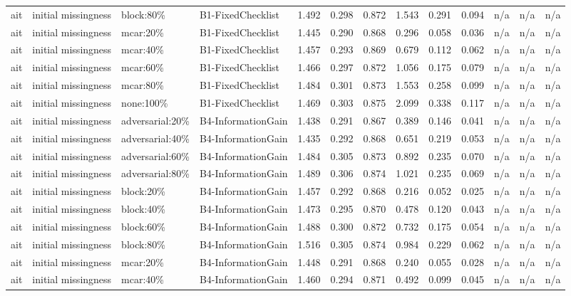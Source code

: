 \begin{table}[!ht]
{\begin{tabular}{lllllllllllll}
ait & initial missingness & block:80\% & B1-FixedChecklist & 1.492 & 0.298 & 0.872 & 1.543 & 0.291 & 0.094 & n/a & n/a & n/a \\
ait & initial missingness & mcar:20\% & B1-FixedChecklist & 1.445 & 0.290 & 0.868 & 0.296 & 0.058 & 0.036 & n/a & n/a & n/a \\
ait & initial missingness & mcar:40\% & B1-FixedChecklist & 1.457 & 0.293 & 0.869 & 0.679 & 0.112 & 0.062 & n/a & n/a & n/a \\
ait & initial missingness & mcar:60\% & B1-FixedChecklist & 1.466 & 0.297 & 0.872 & 1.056 & 0.175 & 0.079 & n/a & n/a & n/a \\
ait & initial missingness & mcar:80\% & B1-FixedChecklist & 1.484 & 0.301 & 0.873 & 1.553 & 0.258 & 0.099 & n/a & n/a & n/a \\
ait & initial missingness & none:100\% & B1-FixedChecklist & 1.469 & 0.303 & 0.875 & 2.099 & 0.338 & 0.117 & n/a & n/a & n/a \\
ait & initial missingness & adversarial:20\% & B4-InformationGain & 1.438 & 0.291 & 0.867 & 0.389 & 0.146 & 0.041 & n/a & n/a & n/a \\
ait & initial missingness & adversarial:40\% & B4-InformationGain & 1.435 & 0.292 & 0.868 & 0.651 & 0.219 & 0.053 & n/a & n/a & n/a \\
ait & initial missingness & adversarial:60\% & B4-InformationGain & 1.484 & 0.305 & 0.873 & 0.892 & 0.235 & 0.070 & n/a & n/a & n/a \\
ait & initial missingness & adversarial:80\% & B4-InformationGain & 1.489 & 0.306 & 0.874 & 1.021 & 0.235 & 0.069 & n/a & n/a & n/a \\
ait & initial missingness & block:20\% & B4-InformationGain & 1.457 & 0.292 & 0.868 & 0.216 & 0.052 & 0.025 & n/a & n/a & n/a \\
ait & initial missingness & block:40\% & B4-InformationGain & 1.473 & 0.295 & 0.870 & 0.478 & 0.120 & 0.043 & n/a & n/a & n/a \\
ait & initial missingness & block:60\% & B4-InformationGain & 1.488 & 0.300 & 0.872 & 0.732 & 0.175 & 0.054 & n/a & n/a & n/a \\
ait & initial missingness & block:80\% & B4-InformationGain & 1.516 & 0.305 & 0.874 & 0.984 & 0.229 & 0.062 & n/a & n/a & n/a \\
ait & initial missingness & mcar:20\% & B4-InformationGain & 1.448 & 0.291 & 0.868 & 0.240 & 0.055 & 0.028 & n/a & n/a & n/a \\
ait & initial missingness & mcar:40\% & B4-InformationGain & 1.460 & 0.294 & 0.871 & 0.492 & 0.099 & 0.045 & n/a & n/a & n/a \\

\end{tabular}}
\end{table}
